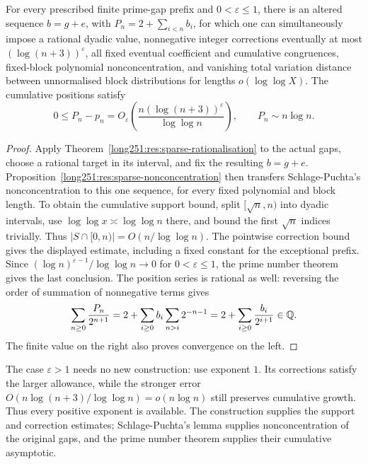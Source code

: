\documentclass[11pt]{article}
\begin{document}
\begin{samepage}
\begin{corollary}\label{long251:res:jointcountermodel}
For every prescribed finite prime-gap prefix and $0<\varepsilon\le1$,
there is an altered sequence $b=g+e$, with $P_n=2+\sum_{i<n}b_i$,
for which one can simultaneously impose a rational dyadic value, nonnegative
integer corrections eventually at most $(\log(n+3))^\varepsilon$,
all fixed eventual coefficient and cumulative congruences,
fixed-block polynomial nonconcentration, and vanishing total variation distance between unnormalised block distributions for lengths $o(\log\log X)$.  The cumulative positions satisfy
\[
 0\le P_n-p_n=O_\varepsilon\left(
    \frac{n(\log(n+3))^\varepsilon}{\log\log n}\right),
 \qquad P_n\sim n\log n.
\]
\end{corollary}

\end{samepage}
\begin{proof}
Apply Theorem~\ref{long251:res:sparse-rationalisation} to the actual gaps,
choose a rational target in its interval, and fix the resulting $b=g+e$.
Proposition~\ref{long251:res:sparse-nonconcentration} then transfers
Schlage-Puchta's nonconcentration \cite[Lemma~4]{schlagepuchta2011} to this
one sequence, for every fixed polynomial and block length.
To obtain the cumulative support bound, split $[\sqrt n,n)$ into dyadic
intervals, use $\log\log x\asymp\log\log n$ there, and bound the first
$\sqrt n$ indices trivially.  Thus $|S\cap[0,n)|=O(n/\log\log n)$.
The pointwise correction bound gives the displayed estimate, including
a fixed constant for the exceptional prefix.  Since
$(\log n)^{\varepsilon-1}/\log\log n\to0$ for $0<\varepsilon\le1$,
the prime number theorem \cite[Chapter~6]{mv2007} gives the last conclusion.
The position series is rational as well: reversing the order of summation
of nonnegative terms gives
\[
 \sum_{n\ge0}\frac{P_n}{2^{n+1}}
 =2+\sum_{i\ge0}b_i\sum_{n>i}2^{-n-1}
 =2+\sum_{i\ge0}\frac{b_i}{2^{i+1}}\in\mathbb{Q}.
\]
The finite value on the right also proves convergence on the left.
\end{proof}
The case $\varepsilon>1$ needs no new construction: use exponent $1$.
Its corrections satisfy the larger allowance, while the stronger error
$O(n\log(n+3)/\log\log n)=o(n\log n)$ still preserves cumulative growth.
Thus every positive exponent is available.  The construction supplies
the support and correction estimates; Schlage-Puchta's lemma supplies
nonconcentration of the original gaps, and the prime number theorem
supplies their cumulative asymptotic.
\end{document}
